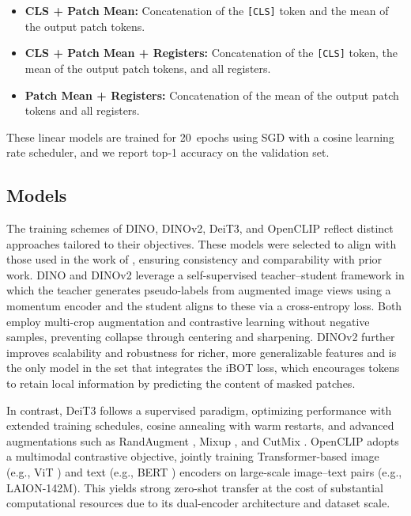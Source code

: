 \documentclass[10pt]{article} %
\begin{document}
\begin{itemize}
    \item \textbf{CLS + Patch Mean:} Concatenation of the \texttt{[CLS]} token and the mean of the output patch tokens.  
    \item \textbf{CLS + Patch Mean + Registers:} Concatenation of the \texttt{[CLS]} token, the mean of the output patch tokens, and all registers.  
    \item \textbf{Patch Mean + Registers:} Concatenation of the mean of the output patch tokens and all registers.  
\end{itemize}

These linear models are trained for 20~epochs using SGD with a cosine learning rate scheduler, and we report top-1 accuracy on the validation set.

\subsection{Models}

The training schemes of DINO, DINOv2, DeiT3, and OpenCLIP reflect distinct approaches tailored to their objectives. These models were selected to align with those used in the work of \citet{darcet2024registers}, ensuring consistency and comparability with prior work. DINO \citep{Caron2021dino} and DINOv2 \citep{oquab2023dinov2} leverage a self-supervised teacher–student framework in which the teacher generates pseudo-labels from augmented image views using a momentum encoder and the student aligns to these via a cross-entropy loss. Both employ multi-crop augmentation and contrastive learning without negative samples, preventing collapse through centering and sharpening. DINOv2 further improves scalability and robustness for richer, more generalizable features and is the only model in the set that integrates the iBOT loss, which encourages tokens to retain local information by predicting the content of masked patches.

In contrast, DeiT3 \citep{touvron2022deit} follows a supervised paradigm, optimizing performance with extended training schedules, cosine annealing with warm restarts, and advanced augmentations such as RandAugment \citep{randaugment}, Mixup \citep{mixup}, and CutMix \citep{cutmix}. OpenCLIP \citep{datacomp2023} adopts a multimodal contrastive objective, jointly training Transformer-based image (e.g., ViT \citep{dosovitskiy2021vit}) and text (e.g., BERT \citep{devlin2019bert}) encoders on large-scale image–text pairs (e.g., LAION-142M). This yields strong zero-shot transfer at the cost of substantial computational resources due to its dual-encoder architecture and dataset scale.
\end{document}
